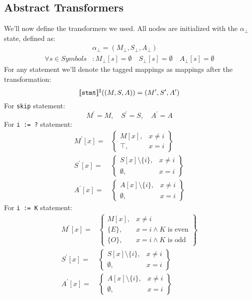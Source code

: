 \subsection*{Abstract Transformers}
We'll now define the transformers we used. All nodes are initialized with the $\alpha_\bot$ state, defined as:
\begin{align*}
	&\alpha_\bot=(M_\bot, S_\bot, A_\bot) \\
	\forall s \in Symbols&:
	M_\bot[s] =\emptyset  \quad
	S_\bot[s] =\emptyset \quad
	A_\bot[s] =\emptyset
\end{align*}
For any statement we'll denote the tagged mappings as mappings after the transformation:
\begin{equation*}
	[\![\texttt{stmt}]\!]^\sharp((M, S, A)) = (M^\prime,S^\prime,A^\prime)
\end{equation*}
For \texttt{skip} statement:
\begin{equation*}
	M^\prime = M, \quad S^\prime = S, \quad A^\prime = A
\end{equation*}
For \texttt{i := ?} statement:
\begin{align*}
M^\prime[x] = & \left.
	\begin{cases}
		M[x], & x\ne i \\
		\top, & x = i
	\end{cases}
\right\}\\
S^\prime[x] = & \left.
	\begin{cases}
		S[x] \setminus \{i\}, & x\ne i \\
		\emptyset, & x = i
	\end{cases}
\right\}\\
A^\prime[x] = & \left.
\begin{cases}
	A[x] \setminus \{i\}, & x\ne i \\
	\emptyset, & x = i
\end{cases}
\right\}
\end{align*}
For \texttt{i := K} statement:
\begin{align*}
M^\prime[x] = & \left.
	\begin{cases}
		M[x], & x\ne i \\
		\{E\}, & x = i \wedge K \text{ is even} \\
		\{O\}, & x = i \wedge K \text{ is odd}
	\end{cases}
\right\}\\
S^\prime[x] = & \left.
	\begin{cases}
		S[x] \setminus \{i\}, & x\ne i \\
		\emptyset, & x = i
	\end{cases}
\right\}\\
A^\prime[x] = & \left.
\begin{cases}
	A[x] \setminus \{i\}, & x\ne i \\
	\emptyset, & x = i
\end{cases}
\right\}
\end{align*}
